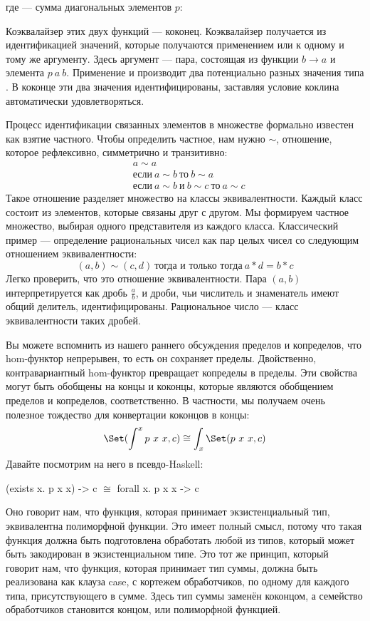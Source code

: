 где  --- сумма диагональных элементов $p$:

Коэквалайзер этих двух функций --- коконец. Коэквалайзер
получается из  идентификацией значений, которые
получаются применением  или  к одному и тому же
аргументу. Здесь аргумент --- пара, состоящая из функции
$b \to a$ и элемента $p\ a\ b$.
Применение  и  производит два потенциально
разных значения типа . В коконце эти
два значения идентифицированы, заставляя условие коклина автоматически
удовлетворяться.

Процесс идентификации связанных элементов в множестве формально
известен как взятие частного. Чтобы определить частное, нам нужно
 $\sim$, отношение, которое
рефлексивно, симметрично и транзитивно:
\begin{align*}
   & a \sim a                                                         \\
   & \text{если}\ a \sim b\ \text{то}\ b \sim a                       \\
   & \text{если}\ a \sim b\ \text{и}\ b \sim c\ \text{то}\ a \sim c
\end{align*}
Такое отношение разделяет множество на классы эквивалентности. Каждый класс
состоит из элементов, которые связаны друг с другом. Мы формируем частное
множество, выбирая одного представителя из каждого класса. Классический пример ---
определение рациональных чисел как пар целых чисел со следующим
отношением эквивалентности:
\[(a, b) \sim (c, d)\ \text{тогда и только тогда}\ a * d = b * c\]
Легко проверить, что это отношение эквивалентности. Пара
$(a, b)$ интерпретируется как дробь $\frac{a}{b}$, и
дроби, чьи числитель и знаменатель имеют общий делитель, идентифицированы. Рациональное число
--- класс эквивалентности таких дробей.

Вы можете вспомнить из нашего раннего обсуждения пределов и копределов, что
hom-функтор непрерывен, то есть он сохраняет пределы. Двойственно, контравариантный
hom-функтор превращает копределы в пределы. Эти свойства
могут быть обобщены на концы и коконцы, которые являются обобщением
пределов и копределов, соответственно. В частности, мы получаем очень полезное
тождество для конвертации коконцов в концы:
\[\Set(\int^x p\ x\ x, c) \cong \int_x \Set(p\ x\ x, c)\]
Давайте посмотрим на него в псевдо-Haskell:

\begin{snipv}
(exists x. p x x) -> c \ensuremath{\cong} forall x. p x x -> c
\end{snipv}
Оно говорит нам, что функция, которая принимает экзистенциальный тип, эквивалентна
полиморфной функции. Это имеет полный смысл, потому что такая
функция должна быть подготовлена обработать любой из типов, который может быть
закодирован в экзистенциальном типе. Это тот же принцип, который говорит нам,
что функция, которая принимает тип суммы, должна быть реализована как клауза
case, с кортежем обработчиков, по одному для каждого типа, присутствующего в
сумме. Здесь тип суммы заменён коконцом, а семейство обработчиков
становится концом, или полиморфной функцией.

